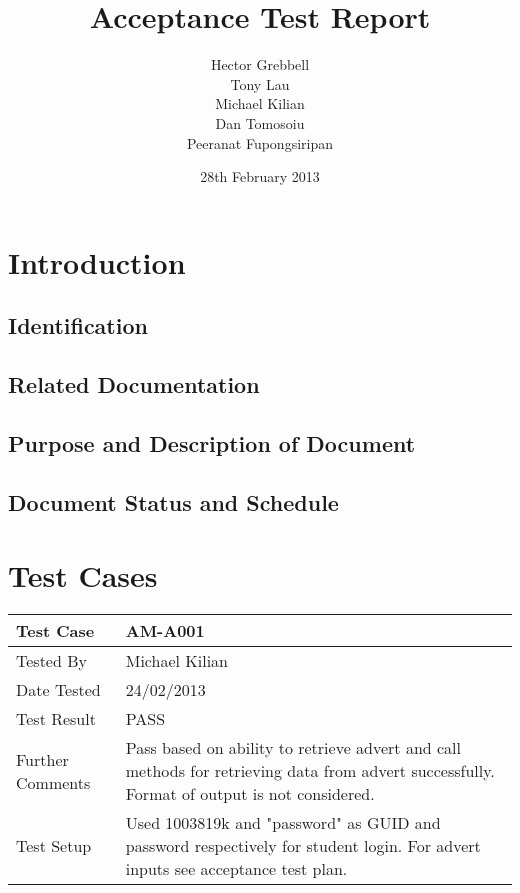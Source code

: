 \documentclass{l3deliverable}
\title{Acceptance Test Report}
\author{
  Hector Grebbell \\
  Tony Lau \\
  Michael Kilian \\
  Dan Tomosoiu \\
  Peeranat Fupongsiripan 
}
\date{28th February 2013}
\begin{document}

\maketitle

\tableofcontents

\newpage


\section{Introduction}

\subsection{Identification}

\subsection{Related Documentation}

\subsection{Purpose and Description of Document}

\subsection{Document Status and Schedule}


\section{Test Cases}


\begin{tabular}{lp{10cm}}
\hline 
\textbf{Test Case} & AM-A001\tabularnewline
\hline 
\hline 
Tested By & Michael Kilian\tabularnewline
\hline 
Date Tested & 24/02/2013\tabularnewline
\hline 
Test Result & PASS\tabularnewline
\hline
Further Comments & Pass based on ability to retrieve advert and call methods for retrieving data from advert successfully. Format of output is not considered. \tabularnewline
\hline
Test Setup & Used 1003819k and "password" as GUID and password respectively for student login. For advert inputs see acceptance test plan. \tabularnewline
\hline
\end{tabular}\\
\end{document}
